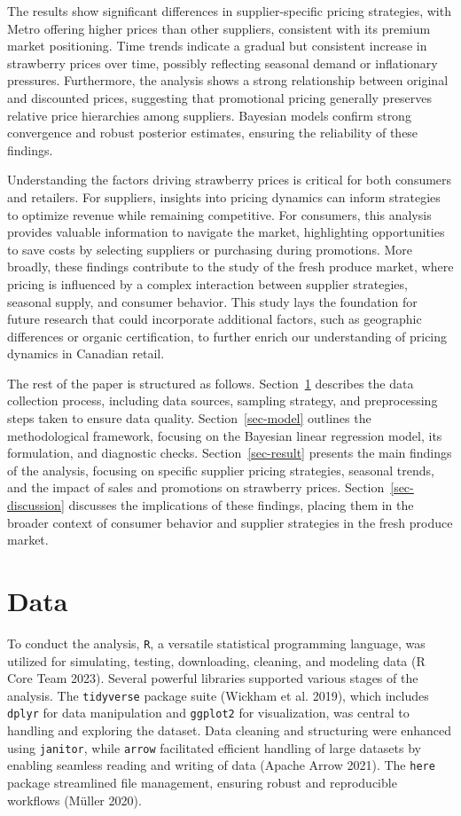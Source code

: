 \documentclass[
  letterpaper,
  DIV=11,
  numbers=noendperiod]{scrartcl}
\begin{document}
The results show significant differences in supplier-specific pricing
strategies, with Metro offering higher prices than other suppliers,
consistent with its premium market positioning. Time trends indicate a
gradual but consistent increase in strawberry prices over time, possibly
reflecting seasonal demand or inflationary pressures. Furthermore, the
analysis shows a strong relationship between original and discounted
prices, suggesting that promotional pricing generally preserves relative
price hierarchies among suppliers. Bayesian models confirm strong
convergence and robust posterior estimates, ensuring the reliability of
these findings.

Understanding the factors driving strawberry prices is critical for both
consumers and retailers. For suppliers, insights into pricing dynamics
can inform strategies to optimize revenue while remaining competitive.
For consumers, this analysis provides valuable information to navigate
the market, highlighting opportunities to save costs by selecting
suppliers or purchasing during promotions. More broadly, these findings
contribute to the study of the fresh produce market, where pricing is
influenced by a complex interaction between supplier strategies,
seasonal supply, and consumer behavior. This study lays the foundation
for future research that could incorporate additional factors, such as
geographic differences or organic certification, to further enrich our
understanding of pricing dynamics in Canadian retail.

The rest of the paper is structured as follows. Section~\ref{sec-data}
describes the data collection process, including data sources, sampling
strategy, and preprocessing steps taken to ensure data quality.
Section~\ref{sec-model} outlines the methodological framework, focusing
on the Bayesian linear regression model, its formulation, and diagnostic
checks. Section~\ref{sec-result} presents the main findings of the
analysis, focusing on specific supplier pricing strategies, seasonal
trends, and the impact of sales and promotions on strawberry prices.
Section~\ref{sec-discussion} discusses the implications of these
findings, placing them in the broader context of consumer behavior and
supplier strategies in the fresh produce market.

\section{Data}\label{sec-data}

To conduct the analysis, \texttt{R}, a versatile statistical programming
language, was utilized for simulating, testing, downloading, cleaning,
and modeling data (R Core Team 2023). Several powerful libraries
supported various stages of the analysis. The \texttt{tidyverse} package
suite (Wickham et al. 2019), which includes \texttt{dplyr} for data
manipulation and \texttt{ggplot2} for visualization, was central to
handling and exploring the dataset. Data cleaning and structuring were
enhanced using \texttt{janitor}, while \texttt{arrow} facilitated
efficient handling of large datasets by enabling seamless reading and
writing of data (Apache Arrow 2021). The \texttt{here} package
streamlined file management, ensuring robust and reproducible workflows
(Müller 2020).
\end{document}
